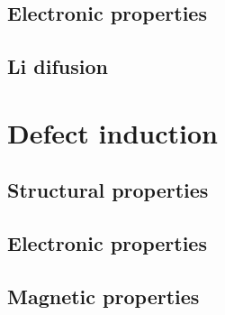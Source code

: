 \subsection{Electronic properties}
\subsection{Li difusion}

\section{Defect induction}
\subsection{Structural properties}
\subsection{Electronic properties}
\subsection{Magnetic properties}